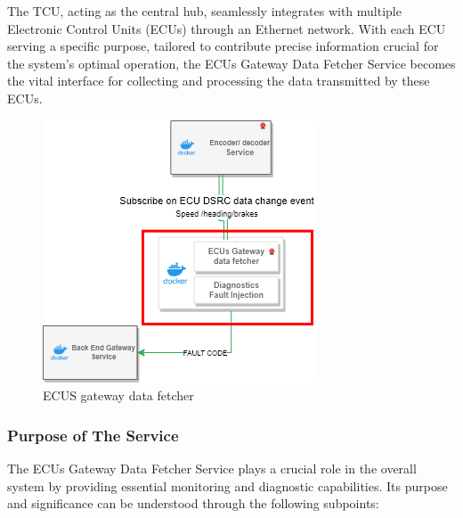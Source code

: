 \documentclass[
12pt,
oneside, 
onehalfspacing, 
nolistspacing, 
parskip, 
chapterinoneline, 
]{AASTCOMPUTER}
\begin{document}
The TCU, acting as the central hub, seamlessly integrates with multiple Electronic Control Units (ECUs) through an Ethernet network. With each ECU serving a specific purpose, tailored to contribute precise information crucial for the system's optimal operation, the ECUs Gateway Data Fetcher Service becomes the vital interface for collecting and processing the data transmitted by these ECUs.

\begin{figure}[!ht]
\centering
\includegraphics[scale=0.5]{Figures/27.png}
\caption[ECUS gateway data fetcher]{ECUS gateway data fetcher}
\label{fig:ECUS gateway data fetcher}
\end{figure}
\subsubsection{Purpose of The Service}
The ECUs Gateway Data Fetcher Service plays a crucial role in the overall system by providing essential monitoring and diagnostic capabilities. Its purpose and significance can be understood through the following subpoints:
\end{document}
